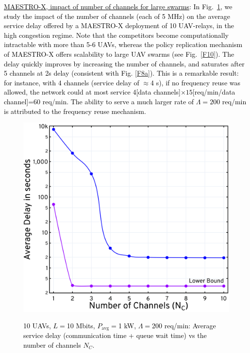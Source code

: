\documentclass[10pt, twocolumn]{IEEEtran}
\theoremstyle{plain}
\theoremstyle{definition}
\theoremstyle{remark}
\newcommand\hlt[1]{\textcolor{black}{#1}}
\begin{document}
{\noindent
\hlt{{\underline{MAESTRO-X, impact of number of channels for large swarms}}:  In Fig.~\ref{F10a}, we study the impact of the number of channels (each of 5 MHz) on the average service delay offered by a MAESTRO-X deployment of 10 UAV-relays, in the high congestion regime.
Note that the competitors become computationally intractable with more than 5-6 UAVs,
whereas the policy replication mechanism of MAESTRO-X offers scalability to large UAV swarms
(see Fig.~\ref{F10}). The delay quickly improves by increasing the number of channels, and saturates after 5 channels at 2s delay (consistent with Fig. \ref{F8a}). This is a remarkable result: for instance, with 4 channels (service delay of $\approx$4 s), if no frequency reuse was allowed, the network could at most service 4[data channels]$\times 15$[req/min/data channel]=60 req/min. The ability to serve a much larger rate of $\Lambda=200$ req/min is attributed to the frequency reuse mechanism.}
\begin{figure}[t]
	\begin{minipage}[b]{0.47\linewidth}
	\centering
	\includegraphics[width=0.95\linewidth]{figs/Delay_NC_10_UAVs.jpg}
	\caption{\hlt{10 UAVs, $L{=}$10 Mbits, $P_{\mathrm{avg}}{=}$1 kW, $\Lambda{=}$200 req/min: Average service delay (communication time + queue wait time) vs the number of channels $N_{C}$.}}
    \vspace{-6mm}
	\label{F10a}
\end{minipage}
\hfill
\begin{minipage}[b]{0.51\linewidth}

\end{minipage}
\end{figure}}
\end{document}
